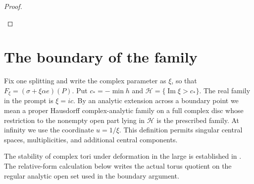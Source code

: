 \documentclass[11pt,a4paper]{article}
\theoremstyle{definition}
\begin{document}
\begin{proof}
\begin{enumerate}[label=\arabic*.]
\end{enumerate}
\end{proof}


\section{The boundary of the family}

Fix one splitting and write the complex parameter as $\xi$, so that
$F_\xi=(\sigma+\xi\alpha e)(P)$. Put
$c_*=-\min h$ and $\mathcal H=\{\operatorname{Im}\xi>c_*\}$.
The real family in the prompt is $\xi=ic$.
By an analytic extension across a boundary point we mean a proper
Hausdorff complex-analytic family on a full complex disc whose
restriction to the nonempty open part lying in $\mathcal H$ is
the prescribed family. At infinity we use the coordinate $u=1/\xi$.
This definition permits singular central spaces, multiplicities,
and additional central components.

The stability of complex tori under deformation in the large is
established in \cite[definition, p.~261; Theorem 2.1, p.~264]{Catanese2004}.
The relative-form calculation below writes the actual torus quotient
on the regular analytic open set used in the boundary argument.
\end{document}
